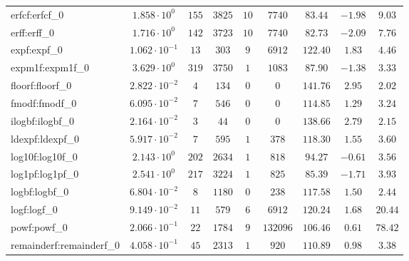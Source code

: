 \begin{tabular}{|l|c|c|c|c|c|c|c|c|}
erfcf:erfcf\_0               & $ 1.858 \cdot 10^{0}  $ & $ 155    $ & $ 3825  $ & $ 10  $ & $ 7740   $ & $ 83.44       $ & $ -1.98   $ & $ 9.03    $ \\
erff:erff\_0                 & $ 1.716 \cdot 10^{0}  $ & $ 142    $ & $ 3723  $ & $ 10  $ & $ 7740   $ & $ 82.73       $ & $ -2.09   $ & $ 7.76    $ \\
expf:expf\_0                 & $ 1.062 \cdot 10^{-1} $ & $ 13     $ & $ 303   $ & $ 9   $ & $ 6912   $ & $ 122.40      $ & $ 1.83    $ & $ 4.46    $ \\
expm1f:expm1f\_0             & $ 3.629 \cdot 10^{0}  $ & $ 319    $ & $ 3750  $ & $ 1   $ & $ 1083   $ & $ 87.90       $ & $ -1.38   $ & $ 3.33    $ \\
floorf:floorf\_0             & $ 2.822 \cdot 10^{-2} $ & $ 4      $ & $ 134   $ & $ 0   $ & $ 0      $ & $ 141.76      $ & $ 2.95    $ & $ 2.02    $ \\
fmodf:fmodf\_0               & $ 6.095 \cdot 10^{-2} $ & $ 7      $ & $ 546   $ & $ 0   $ & $ 0      $ & $ 114.85      $ & $ 1.29    $ & $ 3.24    $ \\
ilogbf:ilogbf\_0             & $ 2.164 \cdot 10^{-2} $ & $ 3      $ & $ 44    $ & $ 0   $ & $ 0      $ & $ 138.66      $ & $ 2.79    $ & $ 2.15    $ \\
ldexpf:ldexpf\_0             & $ 5.917 \cdot 10^{-2} $ & $ 7      $ & $ 595   $ & $ 1   $ & $ 378    $ & $ 118.30      $ & $ 1.55    $ & $ 3.60    $ \\
log10f:log10f\_0             & $ 2.143 \cdot 10^{0}  $ & $ 202    $ & $ 2634  $ & $ 1   $ & $ 818    $ & $ 94.27       $ & $ -0.61   $ & $ 3.56    $ \\
log1pf:log1pf\_0             & $ 2.541 \cdot 10^{0}  $ & $ 217    $ & $ 3224  $ & $ 1   $ & $ 825    $ & $ 85.39       $ & $ -1.71   $ & $ 3.93    $ \\
logbf:logbf\_0               & $ 6.804 \cdot 10^{-2} $ & $ 8      $ & $ 1180  $ & $ 0   $ & $ 238    $ & $ 117.58      $ & $ 1.50    $ & $ 2.44    $ \\
logf:logf\_0                 & $ 9.149 \cdot 10^{-2} $ & $ 11     $ & $ 579   $ & $ 6   $ & $ 6912   $ & $ 120.24      $ & $ 1.68    $ & $ 20.44   $ \\
powf:powf\_0                 & $ 2.066 \cdot 10^{-1} $ & $ 22     $ & $ 1784  $ & $ 9   $ & $ 132096 $ & $ 106.46      $ & $ 0.61    $ & $ 78.42   $ \\
remainderf:remainderf\_0     & $ 4.058 \cdot 10^{-1} $ & $ 45     $ & $ 2313  $ & $ 1   $ & $ 920    $ & $ 110.89      $ & $ 0.98    $ & $ 3.38    $ \\

\end{tabular}
